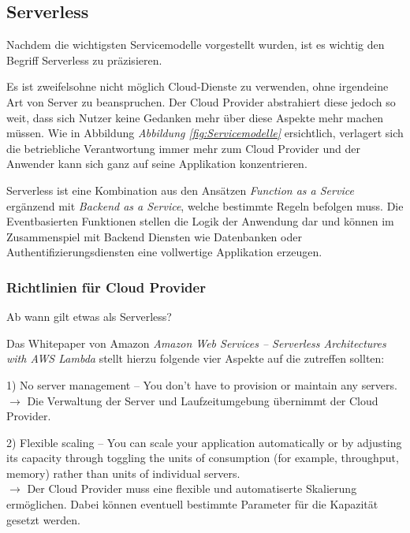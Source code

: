 \subsection{Serverless}
\label{Serverless}
Nachdem die wichtigsten Servicemodelle vorgestellt wurden, ist es wichtig den Begriff Serverless zu präzisieren.

Es ist zweifelsohne nicht möglich Cloud-Dienste zu verwenden, ohne irgendeine Art von Server zu beanspruchen.
Der Cloud Provider abstrahiert diese jedoch so weit, dass sich Nutzer keine Gedanken mehr über diese Aspekte mehr machen müssen.
Wie in Abbildung \textit{Abbildung \ref{fig:Servicemodelle}} ersichtlich, verlagert sich die betriebliche Verantwortung immer mehr zum Cloud Provider und der Anwender kann sich ganz auf seine Applikation konzentrieren.

Serverless ist eine Kombination aus den Ansätzen \textsl{Function as a Service} ergänzend mit \textsl{Backend as a Service}, welche bestimmte Regeln befolgen muss.
Die Eventbasierten Funktionen stellen die Logik der Anwendung dar und können im Zusammenspiel mit
Backend Diensten wie Datenbanken oder Authentifizierungsdiensten eine vollwertige Applikation erzeugen.



\subsubsection{Richtlinien für Cloud Provider }

Ab wann gilt etwas als Serverless?

Das Whitepaper von Amazon \textit{Amazon Web Services – Serverless Architectures with AWS Lambda} \cite[Seite 1]{AWSWhitepaper}
stellt hierzu folgende vier Aspekte auf die zutreffen sollten:

1) \glqq No server management – You don’t have to provision or maintain any servers.\grqq
  \\ $\rightarrow$ Die Verwaltung der Server und Laufzeitumgebung übernimmt der Cloud Provider.

2) \glqq Flexible scaling – You can scale your application automatically or by adjusting its capacity through toggling the units of consumption (for example, throughput, memory) rather than units of individual servers.\grqq
\\ $\rightarrow$ Der Cloud Provider muss eine flexible und automatiserte Skalierung ermöglichen. Dabei können eventuell bestimmte Parameter für die Kapazität gesetzt werden.

